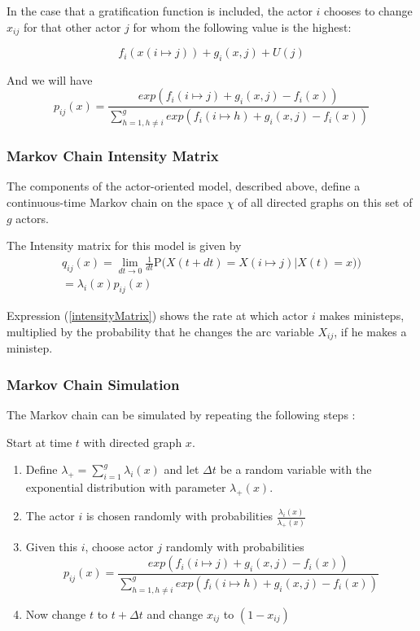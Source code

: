 \documentclass{report}
\begin{document}
In the case that a gratification function is included, the actor $i$ chooses to change $x_{ij}$ for that other actor $j$ for whom the following value is the highest:

\begin{equation}
f_i(x(i \mapsto j)) + g_i(x, j) + U(j)
\end{equation} 

And we will have 
\begin{equation}
\label{ObjectiveFunctionWithGratification}
p_{ij}(x) = \frac{exp(f_i(i \mapsto j) + g_i(x, j) - f_i(x))}{\sum_{h=1, h \neq i}^{g} exp(f_i(i \mapsto h) + g_i(x, j) - f_i(x))}
\end{equation}

\subsubsection{Markov Chain Intensity Matrix}
The components of the actor-oriented model, described above, define a continuous-time Markov chain on the space $\chi$ of all directed graphs on this set of $g$ actors. 

The Intensity matrix for this model is given by
\begin{multline}
\label{intensityMatrix}
q_{ij}(x) = \lim_{dt \to 0} \frac{1}{dt} \mathrm {P} \big({X(t + dt) = X(i \mapsto j) | X(t) = x)}\big) \\ = \lambda_i(x) p_{ij}(x)
\end{multline}

Expression (\ref{intensityMatrix}) shows the rate at which actor $i$ makes ministeps, multiplied by the probability that he changes the arc variable $X_{ij}$, if he makes a ministep.\\

\subsubsection{Markov Chain Simulation}
The Markov chain can be simulated by repeating the following steps \cite{Snijders2004}:

Start at time $t$ with directed graph $x$. 
\begin{enumerate}
\item Define $\lambda_{+} = \sum_{i=1}^g \lambda_i(x)$ and let $\Delta t$ be a random variable with the exponential distribution with parameter $\lambda_{+}(x)$.
\item The actor $i$ is chosen randomly with probabilities $\frac{\lambda_{i}(x)}{\lambda_{+}(x)}$
\item Given this $i$, choose actor $j$ randomly with probabilities 
\begin{equation}
p_{ij}(x) = \frac{exp(f_i(i \mapsto j) + g_i(x, j) - f_i(x))}{\sum_{h=1, h \neq i}^{g} exp(f_i(i \mapsto h) + g_i(x, j) - f_i(x))} \nonumber
\end{equation}
\item Now change $t$ to $t + \Delta t$ and change $x_{ij}$ to $(1 - x_{ij})$
\end{enumerate}
\end{document}
